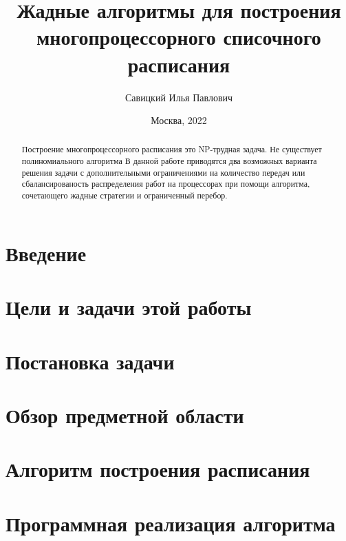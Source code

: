 \documentclass[12pt]{article}
\author{Савицкий Илья Павлович}
\title{Жадные алгоритмы для построения многопроцессорного списочного расписания}
\date{Москва, 2022}
\begin{document}

\newpage
\begin{abstract}
    Построение многопроцессорного расписания это NP-трудная задача. Не существует полиномиального алгоритма  В данной работе приводятся два возможных варианта решения задачи с дополнительными ограничениями на количество передач или сбалансированость распределения работ на процессорах при помощи алгоритма, сочетающего жадные стратегии и ограниченный перебор.
\end{abstract}
\newpage
\tableofcontents
\newpage
\section{Введение}

\newpage
\section{Цели и задачи этой работы}

\newpage
\section{Постановка задачи}

\newpage
\section{Обзор предметной области}


\newpage
\section{Алгоритм построения расписания}


\newpage
\section{Программная реализация алгоритма}

\end{document}
